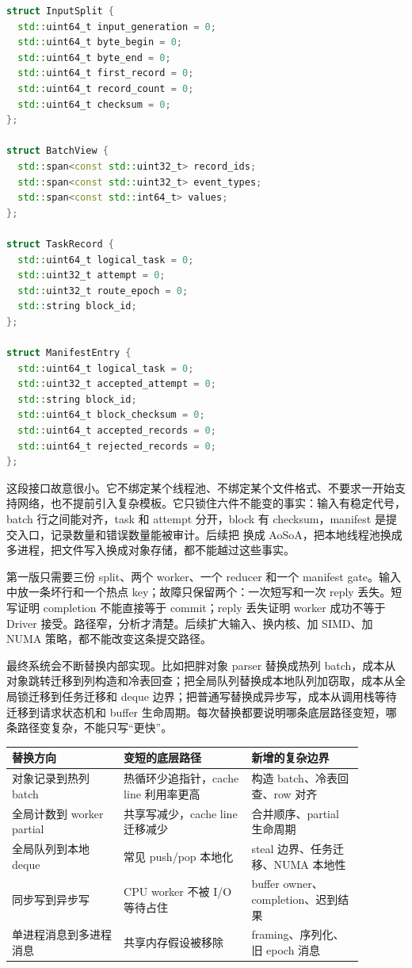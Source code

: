 \begin{lstlisting}[language=C++,caption={最终系统第一版的核心接口}]
struct InputSplit {
  std::uint64_t input_generation = 0;
  std::uint64_t byte_begin = 0;
  std::uint64_t byte_end = 0;
  std::uint64_t first_record = 0;
  std::uint64_t record_count = 0;
  std::uint64_t checksum = 0;
};

struct BatchView {
  std::span<const std::uint32_t> record_ids;
  std::span<const std::uint32_t> event_types;
  std::span<const std::int64_t> values;
};

struct TaskRecord {
  std::uint64_t logical_task = 0;
  std::uint32_t attempt = 0;
  std::uint32_t route_epoch = 0;
  std::string block_id;
};

struct ManifestEntry {
  std::uint64_t logical_task = 0;
  std::uint32_t accepted_attempt = 0;
  std::string block_id;
  std::uint64_t block_checksum = 0;
  std::uint64_t accepted_records = 0;
  std::uint64_t rejected_records = 0;
};
\end{lstlisting}

这段接口故意很小。它不绑定某个线程池、不绑定某个文件格式、不要求一开始支持网络，也不提前引入复杂模板。它只锁住六件不能变的事实：输入有稳定代号，batch 行之间能对齐，task 和 attempt 分开，block 有 checksum，manifest 是提交入口，记录数量和错误数量能被审计。后续把  换成 AoSoA，把本地线程池换成多进程，把文件写入换成对象存储，都不能越过这些事实。

第一版只需要三份 split、两个 worker、一个 reducer 和一个 manifest gate。输入中放一条坏行和一个热点 key；故障只保留两个：一次短写和一次 reply 丢失。短写证明 completion 不能直接等于 commit；reply 丢失证明 worker 成功不等于 Driver 接受。路径窄，分析才清楚。后续扩大输入、换内核、加 SIMD、加 NUMA 策略，都不能改变这条提交路径。

最终系统会不断替换内部实现。比如把胖对象 parser 替换成热列 batch，成本从对象跳转迁移到列构造和冷表回查；把全局队列替换成本地队列加窃取，成本从全局锁迁移到任务迁移和 deque 边界；把普通写替换成异步写，成本从调用栈等待迁移到请求状态机和 buffer 生命周期。每次替换都要说明哪条底层路径变短，哪条路径变复杂，不能只写“更快”。

\begin{center}
\small
\begin{tabular}{@{}p{0.28\linewidth}p{0.32\linewidth}p{0.28\linewidth}@{}}
\toprule
替换方向 & 变短的底层路径 & 新增的复杂边界 \\
\midrule
对象记录到热列 batch & 热循环少追指针，cache line 利用率更高 & 构造 batch、冷表回查、row 对齐 \\
全局计数到 worker partial & 共享写减少，cache line 迁移减少 & 合并顺序、partial 生命周期 \\
全局队列到本地 deque & 常见 push/pop 本地化 & steal 边界、任务迁移、NUMA 本地性 \\
同步写到异步写 & CPU worker 不被 I/O 等待占住 & buffer owner、completion、迟到结果 \\
单进程消息到多进程消息 & 共享内存假设被移除 & framing、序列化、旧 epoch 消息 \\
\bottomrule
\end{tabular}
\end{center}

